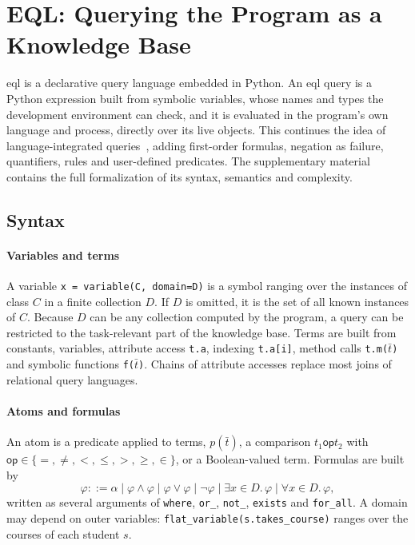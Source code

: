 \documentclass[sigconf,anonymous]{aamas}
\begin{document}
\section{EQL: Querying the Program as a Knowledge Base}
\label{sec:eql}

\ac{eql} is a declarative query language embedded in Python. An \ac{eql} query is a Python expression built from symbolic variables, whose names and types the development environment can check, and it is evaluated in the program's own language and process, directly over its live objects. This continues the idea of language-integrated queries~\cite{meijer2006linq}, adding first-order formulas, negation as failure, quantifiers, rules and user-defined predicates. The supplementary material contains the full formalization of its syntax, semantics and complexity.

\subsection{Syntax}
\label{ssec:eql_syntax}

\paragraph{Variables and terms}
A variable \texttt{x = variable(C, domain=D)} is a symbol ranging over the instances of class $C$ in a finite collection $D$. If $D$ is omitted, it is the set of all known instances of $C$. Because $D$ can be any collection computed by the program, a query can be restricted to the task-relevant part of the knowledge base. Terms are built from constants, variables, attribute access \texttt{t.a}, indexing \texttt{t.a[i]}, method calls \texttt{t.m($\bar t$)} and symbolic functions \texttt{f($\bar t$)}. Chains of attribute accesses replace most joins of relational query languages.

\paragraph{Atoms and formulas}
An atom is a predicate applied to terms, $p(\bar t)$, a comparison $t_1 \mathbin{\mathsf{op}} t_2$ with $\mathsf{op}\in\{=,\neq,<,\le,>,\ge,\in\}$, or a Boolean-valued term. Formulas are built by
\[
\varphi ::= \alpha \mid \varphi\wedge\varphi \mid \varphi\vee\varphi \mid \neg\varphi \mid \exists x\in D.\,\varphi \mid \forall x\in D.\,\varphi ,
\]
written as several arguments of \texttt{where}, \texttt{or\_}, \texttt{not\_}, \texttt{exists} and \texttt{for\_all}. A domain may depend on outer variables: \texttt{flat\_variable(s.takes\_course)} ranges over the courses of each student $s$.
\end{document}
